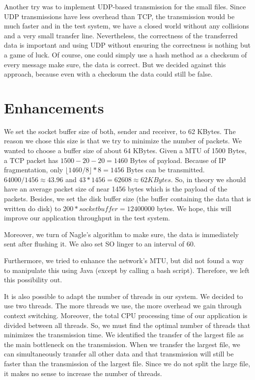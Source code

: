 \documentclass[12pt,a4paper]{article}
\begin{document}
Another try was to implement UDP-based transmission for the small files. Since UDP transmissions have less overhead than TCP, the transmission would be much faster and in the test system, we have a closed world without any collisions and a very small transfer line. Nevertheless, the correctness of the transferred data is important and using UDP without ensuring the correctness is nothing but a game of luck. Of course, one could simply use a hash method as a checksum of every message make sure, the data is correct. But we decided against this approach, because even with a checksum the data could still be false.

\section{Enhancements}
We set the socket buffer size of both, sender and receiver, to 62 KBytes. The reason we chose this size is that we try to minimize the number of packets. We wanted to choose a buffer size of about 64 KBytes. Given a MTU of 1500 Bytes, a TCP packet has $1500 - 20 - 20 = 1460$ Bytes of payload. Because of IP fragmentation, only $\lfloor 1460 / 8 \rfloor * 8 = 1456$ Bytes can be transmitted. $64000/1456 \approx 43.96$ and $43 * 1456 = 62608 \approx 62KBytes$. So, in theory we should have an average packet size of near 1456 bytes which is the payload of the packets. Besides, we set the disk buffer size (the buffer containing the data that is written do disk) to $200 * socket buffer = 12400000$ bytes. We hope, this will improve our application throughput in the test system.

Moreover, we turn of Nagle's algorithm to make sure, the data is immediately sent after flushing it. We also set SO linger to an interval of 60.

Furthermore, we tried to enhance the network's MTU, but did not found a way to manipulate this using Java (except by calling a bash script). Therefore, we left this possibility out.

It is also possible to adapt the number of threads in our system. We decided to use two threads. The more threads we use, the more overhead we gain through context switching. Moreover, the total CPU processing time of our application is divided between all threads. So, we must find the optimal number of threads that minimizes the transmission time. We identified the transfer of the largest file as the main bottleneck on the transmission. When we transfer the largest file, we can simultaneously transfer all other data and that transmission will still be faster than the transmission of the largest file. Since we do not split the large file, it makes no sense to increase the number of threads. 
\end{document}
